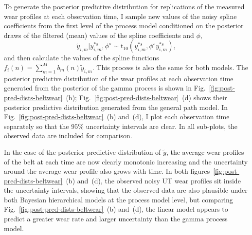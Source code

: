 To generate the posterior predictive distribution for replications of the measured wear profiles at each observation time, I sample new values of the noisy spline coefficients from the first level of the process model conditioned on the posterior draws of the filtered (mean) values of the spline coefficients and $\phi$,
\begin{equation}
  \tilde{y}_{i, m}|y^{*s}_{i, m}, \phi^s \sim \mbox{t}_{10} (y^{*s}_{i, m}, \phi^s y^{*s}_{i, m}),
\end{equation}
and then calculate the values of the spline functions $f_i(n) = \sum^{M}_{m = 1}b_m(n)\tilde{y}_{i, m}$. This process is also the same for both models. The posterior predictive distribution of the wear profiles at each observation time generated from the posterior of the gamma process is shown in Fig.~\ref{fig:post-pred-dists-beltwear}~(b); Fig.~\ref{fig:post-pred-dists-beltwear}~(d) shows their posterior predictive distribution generated from the general path model. In Fig.~\ref{fig:post-pred-dists-beltwear}~(b) and~(d), I plot each observation time separately so that the $95\%$ uncertainty intervals are clear. In all sub-plots, the observed data are included for comparison.

In the case of the posterior predictive distribution of $\tilde{y}$, the average wear profiles of the belt at each time are now clearly monotonic increasing and the uncertainty around the average wear profile also grows with time. In both figures~\ref{fig:post-pred-dists-beltwear}~(b) and~(d), the observed noisy UT wear profiles sit inside the uncertainty intervals, showing that the observed data are also plausible under both Bayesian hierarchical models at the process model level, but comparing Fig.~\ref{fig:post-pred-dists-beltwear}~(b) and~(d), the linear model appears to predict a greater wear rate and larger uncertainty than the gamma process model.

